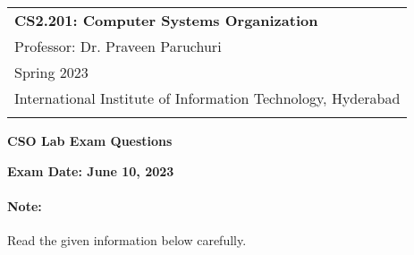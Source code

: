 \documentclass[a4paper,11pt]{article} %
\begin{document}


\thispagestyle{empty} %

\begin{tabular}{p{15.5cm}} %
    {\large \bf CS2.201: Computer Systems Organization} \\
    Professor: Dr. Praveen Paruchuri                    \\ Spring 2023  \\ International Institute of Information Technology, Hyderabad\\
    \hline %
    \\
\end{tabular} %


\begin{center} %
    {\Large \bf CSO Lab Exam Questions}
    \vspace{2mm}

    {\bf Exam Date: June 10, 2023}

\end{center}
\vspace{0.3cm}



\paragraph{\textbf{Note:}} Read the given information below carefully.
\end{document}
